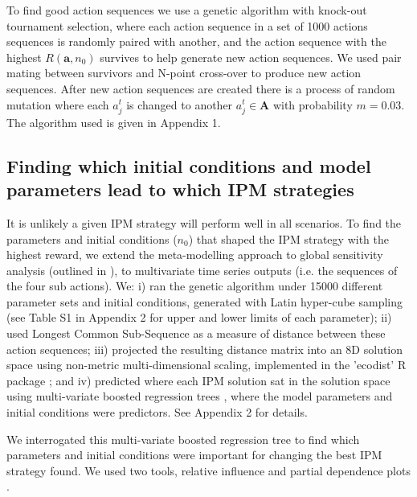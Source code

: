 \documentclass[9pt,twocolumn,twoside,lineno]{pnas-new}
\begin{document}
{To find good action sequences we use a genetic algorithm with knock-out tournament selection, where each action sequence in a set of 1000 actions sequences is randomly paired with another, and the action sequence with the highest $R(\mathbf{a}, n_0)$ survives to help generate new action sequences. We used pair mating between survivors and N-point cross-over to produce new action sequences. After new action sequences are created there is a process of random mutation where each $a_j^t$ is changed to another $a_j^t \in \mathbf{A}$ with probability $m = 0.03$. The algorithm used is given in Appendix 1.        

\subsection*{Finding which initial conditions and model parameters lead to which IPM strategies}
It is unlikely a given IPM strategy will perform well in all scenarios. To find the parameters and initial conditions ($n_0$) that shaped the IPM strategy with the highest reward, we extend the meta-modelling approach to global sensitivity analysis (outlined in \citep{Cout2014}), to multivariate time series outputs (i.e. the sequences of the four sub actions). We: i) ran the genetic algorithm under 15000 different parameter sets and initial conditions, generated with Latin hyper-cube sampling (see Table S1 in Appendix 2 for upper and lower limits of each parameter); ii) used Longest Common Sub-Sequence \citep{Tooh2015} as a measure of distance between these action sequences; iii) projected the resulting distance matrix into an 8D solution space using non-metric multi-dimensional scaling, implemented in the 'ecodist' R package \citep{Gosl2007}; and iv) predicted where each IPM solution sat in the solution space using multi-variate boosted regression trees \citep{Mill2016}, where the model parameters and initial conditions were predictors. See Appendix 2 for details.

We interrogated this multi-variate boosted regression tree to find which parameters and initial conditions were important for changing the best IPM strategy found. We used two tools, relative influence and partial dependence plots \citep{Mill2016}.    
}

\showmatmethods %


\showacknow %


 
\end{document}
